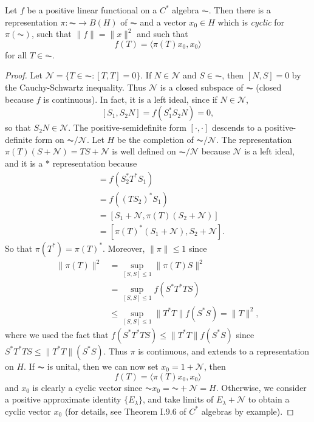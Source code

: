 \begin{theorem}
    Let $f$ be a positive linear functional on a $C^*$ algebra $\AC$. Then there is a representation $\pi: \AC \to B(H)$ of $\AC$ and a vector $x_0 \in H$ which is \emph{cyclic} for $\pi(\AC)$, such that $\| f \| = \| x \|^2$ and such that
    \[ f(T) = \langle \pi(T) x_0, x_0 \rangle \]
    for all $T \in \AC$.
\end{theorem}
\begin{proof}
    Let $\mathcal{N} = \{ T \in \AC: [T,T] = 0 \}$. If $N \in \mathcal{N}$ and $S \in \AC$, then $[N,S] = 0$ by the Cauchy-Schwartz inequality. Thus $\mathcal{N}$ is a closed subspace of $\AC$ (closed because $f$ is continuous). In fact, it is a left ideal, since if $N \in \mathcal{N}$,
    \[ [S_1,S_2N] = f(S_1^* S_2 N) = 0, \]
    so that $S_2 N \in \mathcal{N}$. The positive-semidefinite form $[\cdot,\cdot]$ descends to a positive-definite form on $\AC/\mathcal{N}$. Let $H$ be the completion of $\AC/\mathcal{N}$. The representation $\pi(T)(S + \mathcal{N}) = TS + \mathcal{N}$ is well defined on $\AC/\mathcal{N}$ because $\mathcal{N}$ is a left ideal, and it is a $*$ representation because
    \begin{align*}
        [\pi(T^*) (S_1 + \mathcal{N}), S_2 + \mathcal{N}] &= f(S_2^* T^* S_1)\\
        &= f((TS_2)^* S_1)\\
        &= [S_1 + \mathcal{N}, \pi(T) (S_2 + \mathcal{N})]\\
        &= [\pi(T)^*(S_1 + \mathcal{N}), S_2 + \mathcal{N}].
    \end{align*}
    So that $\pi(T^*) = \pi(T)^*$. Moreover, $\| \pi \| \leq 1$ since
    \begin{align*}
        \| \pi(T) \|^2 &= \sup_{[S,S] \leq 1} \| \pi(T) S \|^2\\
        &= \sup_{[S,S] \leq 1} f(S^* T^* T S)\\
        &\leq \sup_{[S,S] \leq 1} \| T^* T \| f(S^* S) = \| T \|^2,
    \end{align*}
    where we used the fact that $f(S^* T^* T S) \leq \| T^* T \| f(S^* S)$ since $S^* T^* T S \leq \| T^* T \| (S^* S)$. Thus $\pi$ is continuous, and extends to a representation on $H$. If $\AC$ is unital, then we can now set $x_0 = 1 + \mathcal{N}$, then
    \[ f(T) = \langle \pi(T) x_0, x_0 \rangle \]
    and $x_0$ is clearly a cyclic vector since $\AC x_0 = \AC + \mathcal{N} = H$. Otherwise, we consider a positive approximate identity $\{ E_\lambda \}$, and take limits of $E_\lambda + \mathcal{N}$ to obtain a cyclic vector $x_0$ (for details, see Theorem I.9.6 of $C^*$ algebras by example).
\end{proof}

